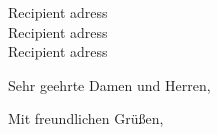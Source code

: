 



\begin{letter}{
        Recipient adress \\ 
        Recipient adress \\ 
        Recipient adress \\ 
    }
\opening{Sehr geehrte Damen und Herren,}

\closing{Mit freundlichen Grüßen,}

\end{letter}

